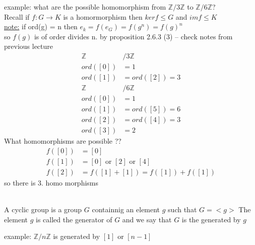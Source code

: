 \documentclass{article}
\begin{document}
example: what are the possible homomorphism from $\mathbb{Z} / 3\mathbb{Z}$ to $ \mathbb{Z} / 6\mathbb{Z}$? \\
Recall if $f: G \to K $ is a homormorphism then $ker f \leq G$ and $im f \leq K$ \\
\underline{note:} if ord(g) = n then $e_k = f(e_G) = f(g^n) = f(g) ^ n$  \\ so $f(g)$ is of order divides n. by proposition 2.6.3 (3) -- check notes from previous lecture
 \\ 
\begin{align*}
     \mathbb{Z} &/ 3\mathbb{Z} \\ 
     ord([0])& = 1\\
    ord([1]) &= ord([2]) = 3 \\ 
    \mathbb{Z} &/ 6\mathbb{Z} \\
    ord([0]) &= 1 \\
    ord([1]) &= ord([5]) = 6 \\
    ord([2]) &= ord([4]) = 3 \\ 
    ord([3]) &= 2
\end{align*}
 What homomorphisms are possible ?? \\ 
\begin{align*}
    f([0]) &= [0] \\
    f([1]) &= [0] \text{ or }  [2] \text{ or }[4]\\
    f([2]) &= f([1] + [1]) = f([1]) + f([1])
\end{align*}
so there is 3. homo morphisms 
\begin{definition}[2.7.1] \leavevmode \\ 
 A cyclic group is a group $G$ containnig an element $g$ such that $G = <g>$ The element $g$ is called the generator of $G$ and we say that $G$ is the generated by $g$ 
    
\end{definition}
example: $\mathbb{Z} / n\mathbb{Z}$ is generated by $[1]$ or $[n-1]$
\end{document}
